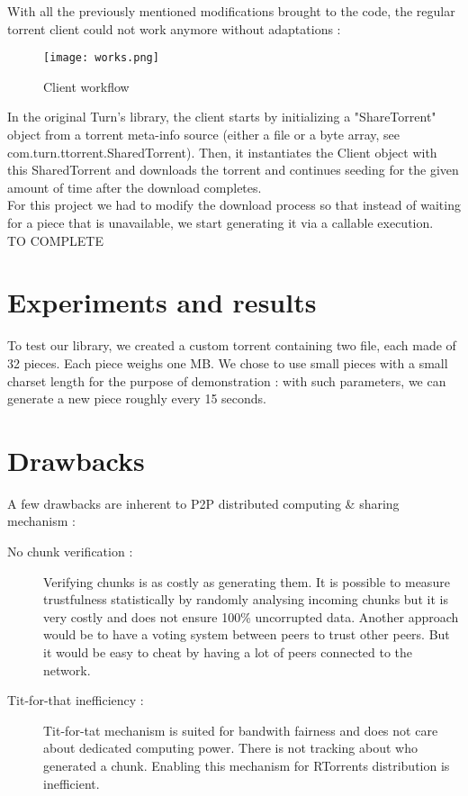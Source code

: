 \documentclass[a4paper]{article}
\begin{document}
{With all the previously mentioned modifications brought to the code, the regular torrent client could not work anymore without adaptations :

\begin{figure}[H]
  \centering
    \texttt{[image: works.png]}
    \caption{Client workflow}
    \label{works}
\end{figure}
\vspace{2mm}

In the original Turn's library, the client starts by initializing a "ShareTorrent" object from a torrent meta-info source (either a file or a byte array, see com.turn.ttorrent.SharedTorrent). Then, it instantiates the Client object with this SharedTorrent and downloads the torrent and continues seeding for the given amount of time after the download completes.\\

For this project we had to modify the download process so that instead of waiting for a piece that is unavailable, we start generating it via a callable execution. \\

TO COMPLETE

\section{Experiments and results}

To test our library, we created a custom torrent containing two file, each made of 32 pieces. Each piece weighs one MB. We chose to use small pieces with a small charset length for the purpose of demonstration : with such parameters, we can generate a new piece roughly every 15 seconds.\\

\section{Drawbacks}

A few drawbacks are inherent to P2P distributed computing \& sharing mechanism :\\

\begin{description}
	\item [No chunk verification : ] Verifying chunks is as costly as generating them. It is possible to measure trustfulness statistically by randomly analysing incoming chunks but it is very costly and does not ensure 100\% uncorrupted data. Another approach would be to have a voting system between peers to trust other peers. But it would be easy to cheat by having a lot of peers connected to the network.\\
	\item[Tit-for-that inefficiency : ] Tit-for-tat mechanism is suited for bandwith fairness and does not care about dedicated computing power. There is not tracking about who generated a chunk. Enabling this mechanism for RTorrents distribution is inefficient.
\end{description}

}
\end{document}
